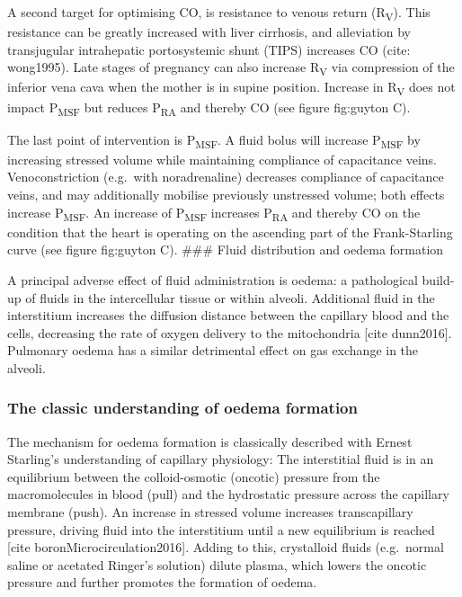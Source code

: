 \documentclass[a4paper, nobind]{templates/ociamthesis}
\begin{document}
A second target for optimising CO, is resistance to venous return (R\textsubscript{V}). This resistance can be greatly increased with liver cirrhosis, and alleviation by transjugular intrahepatic portosystemic shunt (TIPS) increases CO (cite: wong1995). Late stages of pregnancy can also increase R\textsubscript{V} via compression of the inferior vena cava when the mother is in supine position. Increase in R\textsubscript{V} does not impact P\textsubscript{MSF} but reduces P\textsubscript{RA} and thereby CO (see figure fig:guyton C).

The last point of intervention is P\textsubscript{MSF}. A fluid bolus will increase P\textsubscript{MSF} by increasing stressed volume while maintaining compliance of capacitance veins. Venoconstriction (e.g.~with noradrenaline) decreases compliance of capacitance veins, and may additionally mobilise previously unstressed volume; both effects increase P\textsubscript{MSF}. An increase of P\textsubscript{MSF} increases P\textsubscript{RA} and thereby CO on the condition that the heart is operating on the ascending part of the Frank-Starling curve (see figure fig:guyton C).
\#\#\# Fluid distribution and oedema formation

A principal adverse effect of fluid administration is oedema: a pathological build-up of fluids in the intercellular tissue or within alveoli. Additional fluid in the interstitium increases the diffusion distance between the capillary blood and the cells, decreasing the rate of oxygen delivery to the mitochondria {[}cite dunn2016{]}. Pulmonary oedema has a similar detrimental effect on gas exchange in the alveoli.

\hypertarget{the-classic-understanding-of-oedema-formation}{%
\subsubsection{The classic understanding of oedema formation}\label{the-classic-understanding-of-oedema-formation}}

The mechanism for oedema formation is classically described with Ernest Starling's understanding of capillary physiology: The interstitial fluid is in an equilibrium between the colloid-osmotic (oncotic) pressure from the macromolecules in blood (pull) and the hydrostatic pressure across the capillary membrane (push). An increase in stressed volume increases transcapillary pressure, driving fluid into the interstitium until a new equilibrium is reached {[}cite boronMicrocirculation2016{]}. Adding to this, crystalloid fluids (e.g.~normal saline or acetated Ringer's solution) dilute plasma, which lowers the oncotic pressure and further promotes the formation of oedema.
\end{document}
